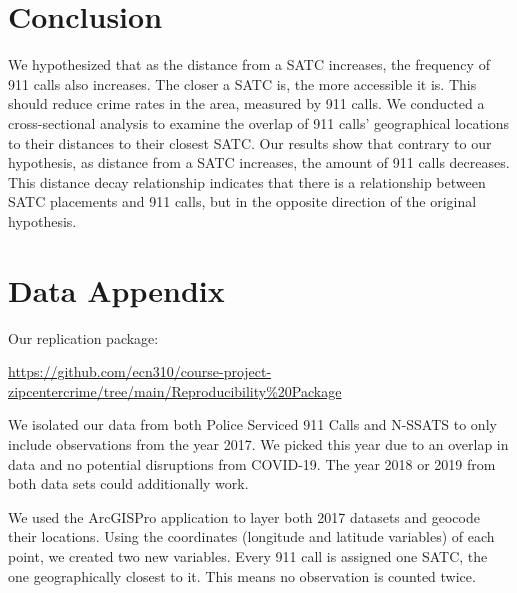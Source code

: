 \documentclass[12pt]{article}
\begin{document}
\section{Conclusion}
\label{sec:conclusion}

We hypothesized that as the distance from a SATC increases, the frequency of 911 calls also increases. The closer a SATC is, the more accessible it is. This should reduce crime rates in the area, measured by 911 calls. We conducted a cross-sectional analysis to examine the overlap of 911 calls' geographical locations to their distances to their closest SATC. Our results show that contrary to our hypothesis, as distance from a SATC increases, the amount of 911 calls decreases. This distance decay relationship indicates that there is a relationship between SATC placements and 911 calls, but in the opposite direction of the original hypothesis. 



 

\newpage
\singlespacing
\setlength\bibsep{0pt}





\newpage
\section*{Data Appendix} \label{sec:appendixa}

Our replication package:

\href{https://github.com/ecn310/course-project-zipcentercrime/tree/main/Reproducibility%20Package}{https://github.com/ecn310/course-project-zipcentercrime/tree/main/Reproducibility\%20Package}

\vspace{10pt}

We isolated our data from both Police Serviced 911 Calls and N-SSATS to only include observations from the year 2017. We picked this year due to an overlap in data and no potential disruptions from COVID-19. The year 2018 or 2019 from both data sets could additionally work. 

We used the ArcGISPro application to layer both 2017 datasets and geocode their locations. Using the coordinates (longitude and latitude variables) of each point, we created two new variables. Every 911 call is assigned one SATC, the one geographically closest to it. This means no observation is counted twice. 
\end{document}
